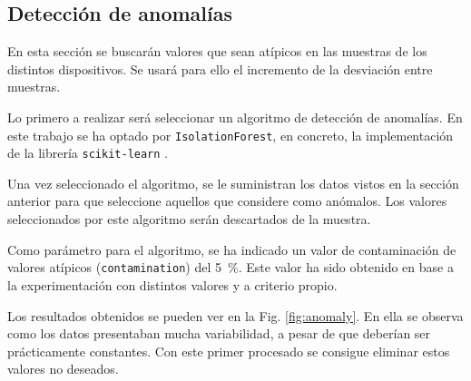 \subsection{Detección de anomalías}

En esta sección se buscarán valores que sean atípicos en las muestras de los distintos dispositivos. Se usará para ello el incremento de la desviación entre muestras. 

Lo primero a realizar será seleccionar un algoritmo de detección de anomalías. En este trabajo se ha optado por \texttt{IsolationForest}, en concreto, la implementación de la librería \texttt{scikit-learn} \cite{scikitisolation}.

Una vez seleccionado el algoritmo, se le suministran los datos vistos en la sección anterior para que seleccione aquellos que considere como anómalos. Los valores seleccionados por este algoritmo serán descartados de la muestra.

Como parámetro para el algoritmo, se ha indicado un valor de contaminación de valores atípicos (\texttt{contamination}) del \SI{5}{\percent}. Este valor ha sido obtenido en base a la experimentación con distintos valores y a criterio propio.

Los resultados obtenidos se pueden ver en la Fig. \ref{fig:anomaly}. En ella se observa como los datos presentaban mucha variabilidad, a pesar de que deberían ser prácticamente constantes. Con este primer procesado se consigue eliminar estos valores no deseados.

